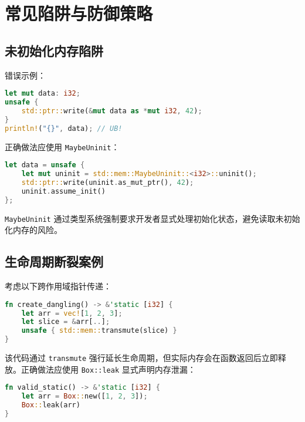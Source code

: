 \chapter{常见陷阱与防御策略}
\section{未初始化内存陷阱}
错误示例：\par
\begin{lstlisting}[language=rust]
let mut data: i32;
unsafe {
    std::ptr::write(&mut data as *mut i32, 42);
}
println!("{}", data); // UB!
\end{lstlisting}
正确做法应使用 \verb!MaybeUninit!：\par
\begin{lstlisting}[language=rust]
let data = unsafe {
    let mut uninit = std::mem::MaybeUninit::<i32>::uninit();
    std::ptr::write(uninit.as_mut_ptr(), 42);
    uninit.assume_init()
};
\end{lstlisting}
\verb!MaybeUninit! 通过类型系统强制要求开发者显式处理初始化状态，避免读取未初始化内存的风险。\par
\section{生命周期断裂案例}
考虑以下跨作用域指针传递：\par
\begin{lstlisting}[language=rust]
fn create_dangling() -> &'static [i32] {
    let arr = vec![1, 2, 3];
    let slice = &arr[..];
    unsafe { std::mem::transmute(slice) }
}
\end{lstlisting}
该代码通过 \verb!transmute! 强行延长生命周期，但实际内存会在函数返回后立即释放。正确做法应使用 \verb!Box::leak! 显式声明内存泄漏：\par
\begin{lstlisting}[language=rust]
fn valid_static() -> &'static [i32] {
    let arr = Box::new([1, 2, 3]);
    Box::leak(arr)
}
\end{lstlisting}
